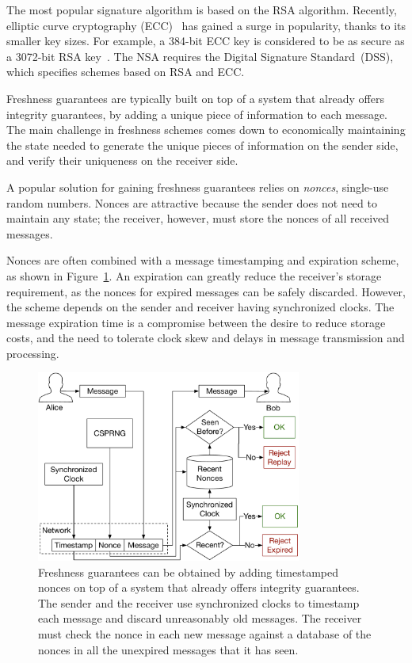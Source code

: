 The most popular signature algorithm is based on the RSA algorithm. Recently,
elliptic curve cryptography (ECC)~\cite{koblitz1987ecc} has gained a surge in
popularity, thanks to its smaller key sizes. For example, a 384-bit ECC key is
considered to be as secure as a 3072-bit RSA key~\cite{fips2012keysize,
nsa2015suiteb}. The NSA requires the Digital Signature
Standard~(DSS)\cite{fips2013dss}, which specifies schemes based on RSA and ECC.


\label{sec:freshness_crypto}

Freshness guarantees are typically built on top of a system that already offers
integrity guarantees, by adding a unique piece of information to each message.
The main challenge in freshness schemes comes down to economically maintaining
the state needed to generate the unique pieces of information on the sender
side, and verify their uniqueness on the receiver side.

A popular solution for gaining freshness guarantees relies on \textit{nonces},
single-use random numbers. Nonces are attractive because the sender does not
need to maintain any state; the receiver, however, must store the nonces of all
received messages.

Nonces are often combined with a message timestamping and expiration scheme, as
shown in Figure~\ref{fig:timestamped_nonces}. An expiration can greatly reduce
the receiver's storage requirement, as the nonces for expired messages can be
safely discarded. However, the scheme depends on the sender and receiver having
synchronized clocks. The message expiration time is a compromise between the
desire to reduce storage costs, and the need to tolerate clock skew and delays
in message transmission and processing.

\begin{figure}[hbt]
  \centering
  \includegraphics[width=87mm]{figures/timestamped_nonces.pdf}
  \caption{
    Freshness guarantees can be obtained by adding timestamped nonces on top
    of a system that already offers integrity guarantees. The sender and the
    receiver use synchronized clocks to timestamp each message and discard
    unreasonably old messages. The receiver must check the nonce in each new
    message against a database of the nonces in all the unexpired messages that
    it has seen.
  }
  \label{fig:timestamped_nonces}
\end{figure}


